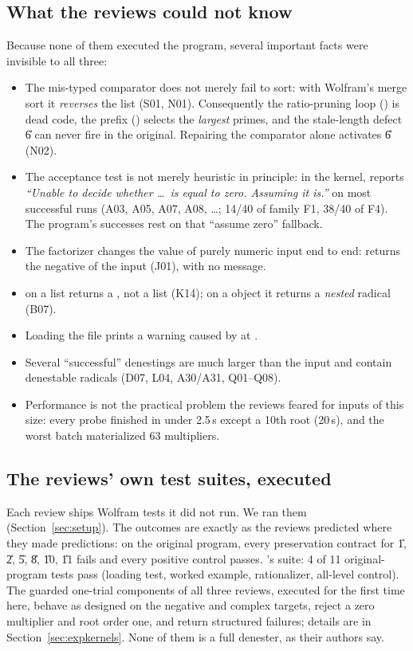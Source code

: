 \subsection{What the reviews could not know}
Because none of them executed the program, several important facts were
invisible to all three:
\begin{itemize}
\item The mis-typed comparator does not merely fail to sort: with Wolfram's
      merge sort it \emph{reverses} the list (S01, N01). Consequently the
      ratio-pruning loop () is dead code, the prefix
      () selects the \emph{largest} primes, and the stale-length
      defect \U{6} can never fire in the original. Repairing the comparator
      alone activates \U{6} (N02).
\item The acceptance test is not merely heuristic in principle: in the
      kernel,  reports \emph{``Unable to decide whether
      \ldots\ is equal to zero. Assuming it is.''} on most successful runs
      (A03, A05, A07, A08, \ldots; 14/40 of family F1, 38/40 of F4). The
      program's successes rest on that ``assume zero'' fallback.
\item The factorizer changes the value of purely numeric input end to end:
       returns the negative of the
      input (J01), with no message.
\item {} on a list returns a , not a list (K14); on a
       object it returns a \emph{nested} radical (B07).
\item Loading the file prints a  warning caused by
       at .
\item Several ``successful'' denestings are much larger than the input and
      contain denestable radicals (D07, L04, A30/A31, Q01--Q08).
\item Performance is not the practical problem the reviews feared for inputs
      of this size: every probe finished in under 2.5\,s except a 10th root
      (20\,s), and the worst batch materialized 63 multipliers.
\end{itemize}

\subsection{The reviews' own test suites, executed}
\label{sec:suites}
Each review ships Wolfram tests it did not run. We ran them
(Section~\ref{sec:setup}). The outcomes are exactly as the reviews predicted
where they made predictions: on the original program, every preservation
contract for \U{1}, \U{2}, \U{5}, \U{8}, \U{10}, \U{11} fails and every
positive control passes. \RII's suite: 4 of 11 original-program tests pass
(loading test, worked example, rationalizer, all-level control). The guarded
one-trial components of all three reviews, executed for the first time here,
behave as designed on the negative and complex targets, reject a zero
multiplier and root order one, and return structured failures; details are in
Section~\ref{sec:expkernels}. None of them is a full denester, as their
authors say.
